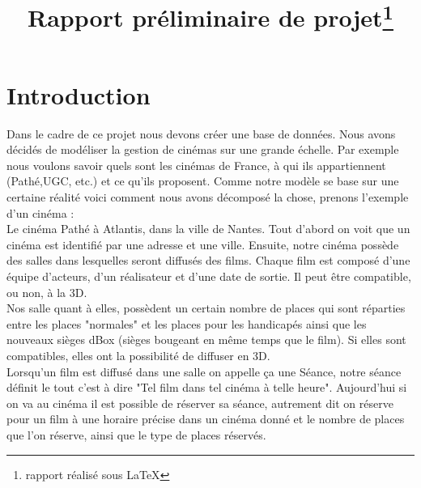 \documentclass[a4paper,sffamily,12pt]{article}
\title{\vspace{\fill}\LARGE\bfseries\sffamily Rapport préliminaire de projet\protect\footnote{rapport réalisé sous \LaTeX} \vspace{\fill}}
\begin{document}
	\date{} %
	\maketitle %

	\thispagestyle{fancy} %
	
	\newpage
			
	\renewcommand{\contentsname}{Sommaire}
	\tableofcontents
	
	\newpage
	
	\section{Introduction}
		
		\vspace{0.5cm}
		
		Dans le cadre de ce projet nous devons créer une base de données. Nous avons décidés de modéliser la gestion de cinémas sur une grande échelle. Par exemple nous voulons savoir quels sont les cinémas de France, à qui ils appartiennent (Pathé,UGC, etc.) et ce qu'ils proposent. Comme notre modèle se base sur une certaine réalité voici comment nous avons décomposé la chose, prenons  l'exemple d'un cinéma : \\
		\indent Le cinéma Pathé à Atlantis, dans la ville de Nantes. Tout d'abord on voit que un cinéma est identifié par une adresse et une ville. Ensuite, notre cinéma possède des salles dans lesquelles seront diffusés des films. Chaque film est composé d'une équipe d'acteurs, d'un réalisateur et d'une date de sortie. Il peut être compatible, ou non, à la 3D. \\ 				\indent Nos salle quant à elles, possèdent un certain nombre de places qui sont réparties entre les places "normales" et les places pour les handicapés ainsi que les nouveaux sièges dBox (sièges bougeant en même temps que le film). Si elles sont compatibles, elles ont la possibilité de diffuser en 3D. \\
		\indent Lorsqu'un film est diffusé dans une salle on appelle ça une Séance, notre séance définit le tout c'est à dire "Tel film dans tel cinéma à telle heure". Aujourd'hui si on va au cinéma il est possible de réserver sa séance, autrement dit on réserve pour un film à une horaire précise dans un cinéma donné et le nombre de places que l'on réserve, ainsi que le type de places réservés. 

		\vspace{0.5cm}
								
\end{document}
